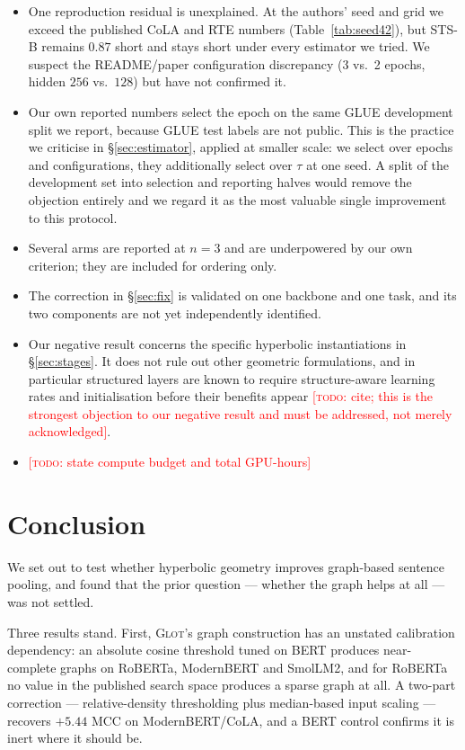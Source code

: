 \documentclass{article} %
\newcommand{\TODO}[1]{\textcolor{red}{[\textsc{todo}: #1]}}
\begin{document}
\begin{itemize}
\item One reproduction residual is unexplained. At the authors' seed and grid
      we exceed the published CoLA and RTE numbers (Table~\ref{tab:seed42}),
      but STS-B remains $0.87$ short and stays short under every estimator we
      tried. We suspect the README/paper configuration discrepancy (3 vs.\ 2
      epochs, hidden $256$ vs.\ $128$) but have not confirmed it.
\item Our own reported numbers select the epoch on the same GLUE development
      split we report, because GLUE test labels are not public. This is the
      practice we criticise in \S\ref{sec:estimator}, applied at smaller
      scale: we select over epochs and configurations, they additionally
      select over $\tau$ at one seed. A split of the development set into
      selection and reporting halves would remove the objection entirely and
      we regard it as the most valuable single improvement to this protocol.
\item Several arms are reported at $n = 3$ and are underpowered by our own
      criterion; they are included for ordering only.
\item The correction in \S\ref{sec:fix} is validated on one backbone and one
      task, and its two components are not yet independently identified.
\item Our negative result concerns the specific hyperbolic instantiations in
      \S\ref{sec:stages}. It does not rule out other geometric formulations,
      and in particular structured layers are known to require structure-aware
      learning rates and initialisation before their benefits appear
      \TODO{cite; this is the strongest objection to our negative result and
      must be addressed, not merely acknowledged}.
\item \TODO{state compute budget and total GPU-hours}
\end{itemize}

\section{Conclusion}
\label{sec:conclusion}

We set out to test whether hyperbolic geometry improves graph-based sentence
pooling, and found that the prior question --- whether the graph helps at all
--- was not settled.

Three results stand. First, \textsc{Glot}'s graph construction has an unstated
calibration dependency: an absolute cosine threshold tuned on BERT produces
near-complete graphs on RoBERTa, ModernBERT and SmolLM2, and for RoBERTa no
value in the published search space produces a sparse graph at all. A two-part
correction --- relative-density thresholding plus median-based input scaling ---
recovers $+5.44$ MCC on ModernBERT/CoLA, and a BERT control confirms it is
inert where it should be.
\end{document}
